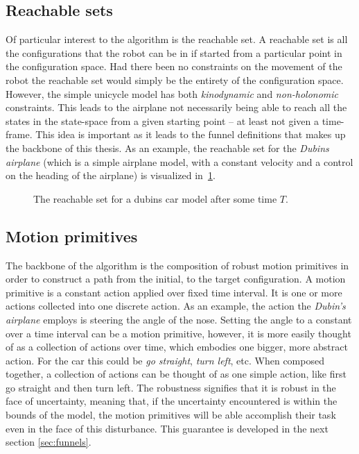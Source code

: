 \subsection{Reachable sets}
\label{subsec:reachable-set}

Of particular interest to the \rrtfunnel{} algorithm is the reachable set. A
reachable set is all the configurations that the robot can be in if started from
a particular point in the configuration space. Had there been no constraints on
the movement of the robot the reachable set would simply be the entirety of the
configuration space. However, the simple unicycle model has both
\textit{kinodynamic} and \textit{non-holonomic} constraints. This leads to the
airplane not necessarily being able to reach all the states in the state-space
from a given starting point -- at least not given a time-frame. This idea is
important as it leads to the funnel definitions that makes up the backbone of
this thesis. As an example, the reachable set for the \textit{Dubins airplane}
(which is a simple airplane model, with a constant velocity and a control on the
heading of the airplane) is visualized in~\cref{fig:reachable-set-dubin}.

\begin{figure}
  \centering 
  \caption{The reachable set for a dubins car model after some time \(T\).}
  \label{fig:reachable-set-dubin}
\end{figure}

\subsection{Motion primitives}

The backbone of the \rrtfunnel{} algorithm is the composition of robust motion
primitives in order to construct a path from the initial, to the target
configuration. A motion primitive is a constant action applied over fixed time
interval. It is one or more actions collected into one discrete action. As an
example, the action the \textit{Dubin's airplane} employs is steering the angle
of the nose. Setting the angle to a constant over a time interval can be a
motion primitive, however, it is more easily thought of as a collection of
actions over time, which embodies one bigger, more abstract action. For the car
this could be \textit{go straight}, \textit{turn left}, etc. When composed
together, a collection of actions can be thought of as one simple action, like
first go straight and then turn left. The robustness signifies that it is robust
in the face of uncertainty, meaning that, if the uncertainty encountered is
within the bounds of the model, the motion primitives will be able accomplish
their task even in the face of this disturbance. This guarantee is developed in
the next section \cref{sec:funnels}.

